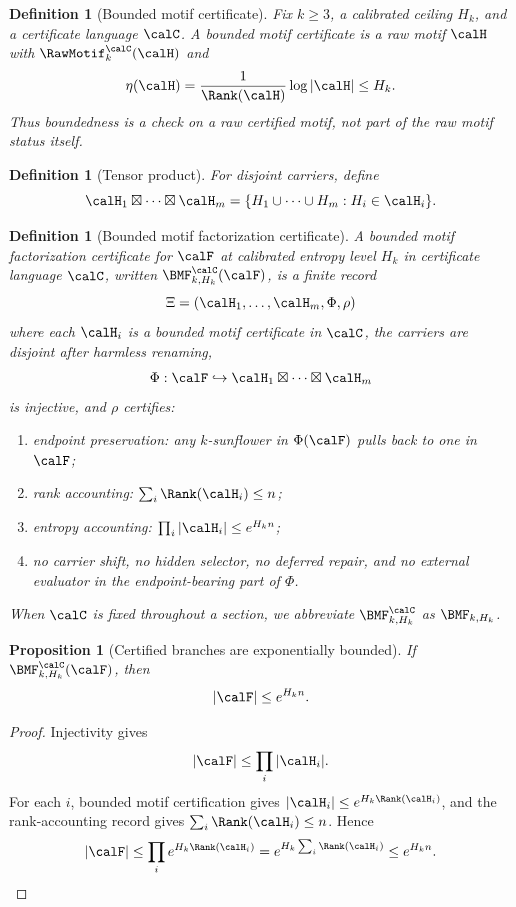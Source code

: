 \documentclass[11pt]{article}
\newtheorem{proposition}[theorem]{Proposition}
\newtheorem{definition}[theorem]{Definition}
\begin{document}
\begin{definition}[Bounded motif certificate]
Fix \(k\ge3\), a calibrated ceiling \(H_k\), and a certificate language \(\calC\).  A bounded motif certificate is a raw motif \(\calH\) with \(\RawMotif^{\calC}_{k}(\calH)\) and
\[
  \eta(\calH)=\frac1{\Rank(\calH)}\log|\calH|\le H_k.
\]
Thus boundedness is a check on a raw certified motif, not part of the raw motif status itself.
\end{definition}

\begin{definition}[Tensor product]
For disjoint carriers, define
\[
  \calH_1\boxtimes\cdots\boxtimes\calH_m
  =\{H_1\cup\cdots\cup H_m:H_i\in\calH_i\}.
\]
\end{definition}

\begin{definition}[Bounded motif factorization certificate]
A bounded motif factorization certificate for \(\calF\) at calibrated entropy level \(H_k\) in certificate language \(\calC\), written \(\BMF^{\calC}_{k,H_k}(\calF)\), is a finite record
\[
  \Xi=(\calH_1,\dots,\calH_m,\Phi,\rho)
\]
where each \(\calH_i\) is a bounded motif certificate in \(\calC\), the carriers are disjoint after harmless renaming,
\[
  \Phi:\calF\hookrightarrow \calH_1\boxtimes\cdots\boxtimes\calH_m
\]
is injective, and \(\rho\) certifies:
\begin{enumerate}[label=(\roman*)]
\item endpoint preservation: any \(k\)-sunflower in \(\Phi(\calF)\) pulls back to one in \(\calF\);
\item rank accounting: \(\sum_i \Rank(\calH_i)\le n\);
\item entropy accounting: \(\prod_i|\calH_i|\le e^{H_k n}\);
\item no carrier shift, no hidden selector, no deferred repair, and no external evaluator in the endpoint-bearing part of \(\Phi\).
\end{enumerate}
When \(\calC\) is fixed throughout a section, we abbreviate \(\BMF^{\calC}_{k,H_k}\) as \(\BMF_{k,H_k}\).
\end{definition}

\begin{proposition}[Certified branches are exponentially bounded]\label{prop:BMF-bound}
If \(\BMF^{\calC}_{k,H_k}(\calF)\), then
\[
  |\calF|\le e^{H_k n}.
\]
\end{proposition}

\begin{proof}
Injectivity gives
\[
  |\calF|\le \prod_i |\calH_i|.
\]
For each \(i\), bounded motif certification gives \(|\calH_i|\le e^{H_k\Rank(\calH_i)}\), and the rank-accounting record gives \(\sum_i\Rank(\calH_i)\le n\).  Hence
\[
  |\calF|\le \prod_i e^{H_k\Rank(\calH_i)}
  =e^{H_k\sum_i\Rank(\calH_i)}
  \le e^{H_k n}.
\]
\end{proof}
\end{document}
